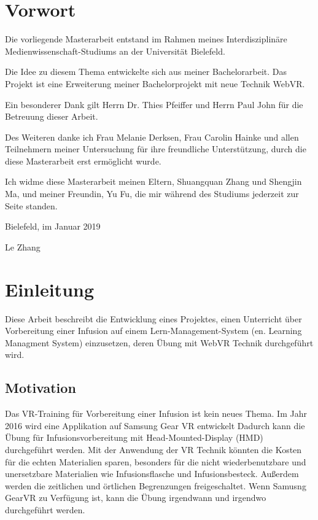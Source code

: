 \chapter*{Vorwort}

Die vorliegende Masterarbeit entstand im Rahmen meines Interdisziplinäre Medienwissenschaft-Studiums an der Universität Bielefeld.
 
Die Idee zu diesem Thema entwickelte sich aus meiner Bachelorarbeit. Das Projekt ist eine Erweiterung meiner Bachelorprojekt mit neue Technik WebVR.
 
Ein besonderer Dank gilt Herrn Dr. Thies Pfeiffer und Herrn Paul John für die Betreuung dieser Arbeit.
 
Des Weiteren danke ich Frau Melanie Derksen, Frau Carolin Hainke und allen Teilnehmern meiner Untersuchung für ihre freundliche Unterstützung, durch die diese Masterarbeit erst ermöglicht wurde.
 
Ich widme diese Masterarbeit meinen Eltern, Shuangquan Zhang und Shengjin Ma, und meiner Freundin, Yu Fu, die mir während des Studiums jederzeit zur Seite standen.

\vspace{5mm}
 
Bielefeld, im Januar 2019
 
Le Zhang

\chapter{Einleitung}

Diese Arbeit beschreibt die Entwicklung eines Projektes, einen Unterricht über Vorbereitung einer Infusion auf einem Lern-Management-System (en. Learning Managment System) einzusetzen, deren Übung mit WebVR Technik durchgeführt wird.

\section{Motivation}

Das VR-Training für Vorbereitung einer Infusion ist kein neues Thema. Im Jahr 2016 wird eine Applikation auf Samsung Gear VR entwickelt\citep{26}
Dadurch kann die Übung für Infusionsvorbereitung mit Head-Mounted-Display (HMD) durchgeführt werden. Mit der Anwendung der VR Technik könnten die Kosten für die echten Materialien sparen, besonders für die nicht wiederbenutzbare und unersetzbare Materialien wie Infusionsflasche und Infusionsbesteck. Außerdem werden die zeitlichen und örtlichen Begrenzungen freigeschaltet. Wenn Samusng GearVR zu Verfügung ist, kann die Übung irgendwann und irgendwo durchgeführt werden.

